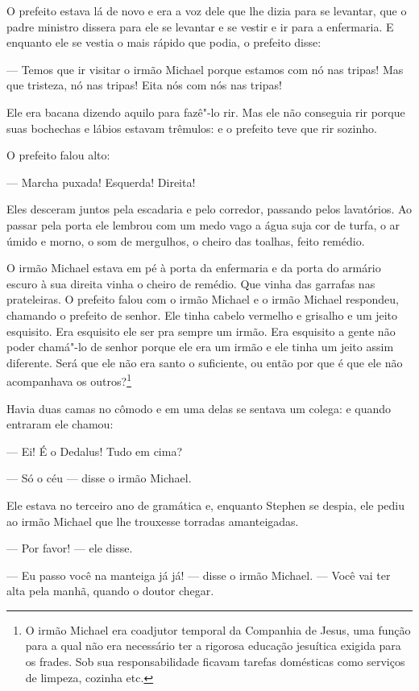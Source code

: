 O prefeito estava lá de novo e era a voz dele que lhe dizia para se
levantar, que o padre ministro dissera para ele se levantar e se vestir 
e ir para a enfermaria. E enquanto ele se vestia o mais rápido que podia,
o prefeito disse:

--- Temos que ir visitar o irmão Michael porque estamos com nó nas
tripas! Mas que tristeza, nó nas tripas! Eita nós com nós nas tripas!

Ele era bacana dizendo aquilo para fazê"-lo rir. Mas ele não conseguia rir
porque suas bochechas e lábios estavam trêmulos: e o prefeito teve que
rir sozinho.

O prefeito falou alto:

 --- Marcha puxada! Esquerda! Direita!

Eles desceram juntos pela escadaria e pelo corredor, passando pelos
lavatórios. Ao passar pela porta ele lembrou com um medo vago a água
suja cor de turfa, o ar úmido e morno, o som de mergulhos, o cheiro das
toalhas, feito remédio.

O irmão Michael estava em pé à porta da enfermaria e da porta do armário
escuro à sua direita vinha o cheiro de remédio. Que vinha das garrafas nas
prateleiras. O prefeito falou com o irmão Michael e o irmão Michael
respondeu, chamando o prefeito de senhor. Ele tinha cabelo vermelho e
grisalho e um jeito esquisito. Era esquisito ele ser pra sempre um
irmão. Era esquisito a gente não poder chamá"-lo de senhor porque ele
era um irmão e ele tinha um jeito assim diferente. Será que ele não era
santo o suficiente, ou então por que é que ele não acompanhava os
outros?\footnote{ O irmão Michael era coadjutor temporal da Companhia de
Jesus, uma função para a qual não era necessário ter a rigorosa
educação jesuítica exigida para os frades. Sob sua responsabilidade
ficavam tarefas domésticas como serviços de limpeza, cozinha etc.}

Havia duas camas no cômodo e em uma delas se sentava um colega: e quando
entraram ele chamou:

 --- Ei! É o Dedalus! Tudo em cima?

 --- Só o céu --- disse o irmão Michael.

Ele estava no terceiro ano de gramática e, enquanto Stephen se despia,
ele pediu ao irmão Michael que lhe trouxesse torradas amanteigadas.

 --- Por favor! --- ele disse.

 --- Eu passo você na manteiga já já! --- disse o irmão Michael. --- Você vai ter alta pela manhã, quando o doutor chegar.

